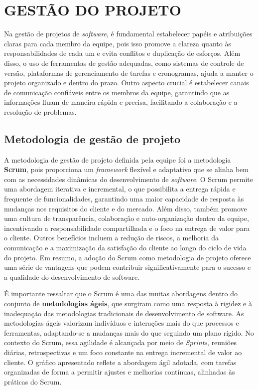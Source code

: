 \chapter{GESTÃO DO PROJETO}
\label{requisitos-aplicacoes}

Na gestão de projetos de \textit{software}, é fundamental estabelecer papéis e atribuições claras para cada membro da equipe, pois isso promove a clareza quanto às responsabilidades de cada um e evita conflitos e duplicação de esforços. Além disso, o uso de ferramentas de gestão adequadas, como sistemas de controle de versão, plataformas de gerenciamento de tarefas e cronogramas, ajuda a manter o projeto organizado e dentro do prazo. Outro aspecto crucial é estabelecer canais de comunicação confiáveis entre os membros da equipe, garantindo que as informações fluam de maneira rápida e precisa, facilitando a colaboração e a resolução de problemas. 

\section{Metodologia de gestão de projeto}

A metodologia de gestão de projeto definida pela equipe foi a metodologia \textbf{Scrum}, pois proporciona um \textit{framework} flexível e adaptativo que se alinha bem com as necessidades dinâmicas do desenvolvimento de \textit{software}. O Scrum permite uma abordagem iterativa e incremental, o que possibilita a entrega rápida e frequente de funcionalidades, garantindo uma maior capacidade de resposta às mudanças nos requisitos do cliente e do mercado. Além disso, também promove uma cultura de transparência, colaboração e auto-organização dentro da equipe, incentivando a responsabilidade compartilhada e o foco na entrega de valor para o cliente. Outros benefícios incluem a redução de riscos, a melhoria da comunicação e a maximização da satisfação do cliente ao longo do ciclo de vida do projeto. Em resumo, a adoção do Scrum como metodologia de projeto oferece uma série de vantagens que podem contribuir significativamente para o sucesso e a qualidade do desenvolvimento de software.

 É importante ressaltar que o Scrum é uma das muitas abordagens dentro do conjunto de \textbf{metodologias ágeis}, que surgiram como uma resposta à rigidez e à inadequação das metodologias tradicionais de desenvolvimento de software. As metodologias ágeis valorizam indivíduos e interações mais do que processos e ferramentas, adaptando-se a mudanças mais do que seguindo um plano rígido. No contexto do Scrum, essa agilidade é alcançada por meio de \textit{Sprints}, reuniões diárias, retrospectivas e um foco constante na entrega incremental de valor ao cliente. O gráfico apresentado reflete a abordagem ágil adotada, com tarefas organizadas de forma a permitir ajustes e melhorias contínuas, alinhadas às práticas do Scrum. 

